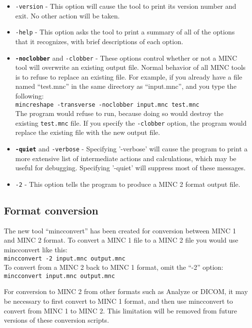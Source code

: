 \documentclass{article}
\begin{document}
\begin{itemize}
\item {\tt -version} - This option will cause the tool to print its
version number and exit.  No other action will be taken.
\item{\tt -help} - This option asks the tool to print a 
summary of all of the options that it recognizes, with brief descriptions
of each option.
\item \texttt{\textbf{-noclobber}} and {\tt -clobber} - These options control
whether or not a MINC tool will overwrite an existing output file.
Normal behavior of all MINC tools is to refuse to replace an existing
file.  For example, if you already have a file named ``test.mnc'' in
the same directory as ``input.mnc'', and you type the following:\\

\mbox{\tt mincreshape -transverse -noclobber input.mnc test.mnc}\\

The program would refuse to run, because doing so would destroy the
existing {\tt test.mnc} file.  If you specify the {\tt -clobber} option, the
program would replace the existing file with the new output file.

\item \texttt{\textbf{-quiet}} and {\tt -verbose} - Specifying
'-verbose' will cause the program to print a more extensive list of
intermediate actions and calculations, which may be useful for
debugging.  Specifying '-quiet' will suppress most of these messages.

\item \texttt{-2} - This option tells the program to produce a MINC 2
format output file.

\end{itemize}

\subsection{Format conversion}
The new tool ``mincconvert'' has been created for conversion between
MINC 1 and MINC 2 format.  To convert a MINC 1 file to a MINC 2 file you
would use mincconvert like this:\\
\mbox{\tt mincconvert -2 input.mnc output.mnc} \\
To convert from a MINC 2 back to MINC 1 format, omit the ``-2'' option: \\
\mbox{\tt mincconvert input.mnc output.mnc}

For conversion to MINC 2 from other formats such as Analyze or DICOM,
it may be necessary to first convert to MINC 1 format, and then use
mincconvert to convert from MINC 1 to MINC 2.  This limitation will be
removed from future versions of these conversion scripts.
\end{document}
